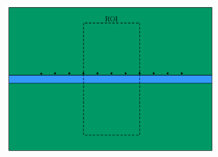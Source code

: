 \documentclass[preprint,authoryear,12pt]{elsarticle}
\begin{document}
\begin{figure}[htp]{}
\begin{center}
\begin{subfigure}{0.49\linewidth}
      \end{subfigure}\hspace{-0.9cm}
      \begin{subfigure}{0.49\linewidth}
         \label{fig:SurveyDesign_StraightTunnel_Layout_SingleLinearArray_Y}
         \includegraphics[trim=0cm 0cm 0cm 0cm, clip=true,width=\linewidth]{./figures/Fig8b.pdf}
      \end{subfigure}


\end{center}
\end{figure}
\end{document}
